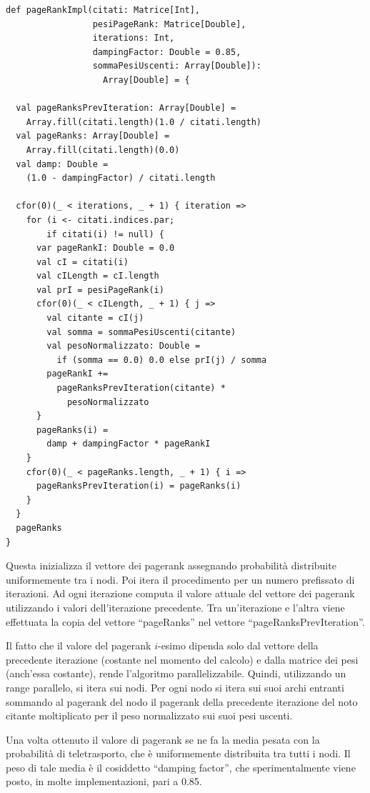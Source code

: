 \documentclass[a4paper, 12pt]{article}
\begin{document}
\begin{lstlisting}[keepspaces=true]
def pageRankImpl(citati: Matrice[Int],
                 pesiPageRank: Matrice[Double],
                 iterations: Int,
                 dampingFactor: Double = 0.85,
                 sommaPesiUscenti: Array[Double]):
                   Array[Double] = {

  val pageRanksPrevIteration: Array[Double] =
    Array.fill(citati.length)(1.0 / citati.length)
  val pageRanks: Array[Double] =
    Array.fill(citati.length)(0.0)
  val damp: Double = 
    (1.0 - dampingFactor) / citati.length

  cfor(0)(_ < iterations, _ + 1) { iteration =>
    for (i <- citati.indices.par;
        if citati(i) != null) {
      var pageRankI: Double = 0.0
      val cI = citati(i)
      val cILength = cI.length
      val prI = pesiPageRank(i)
      cfor(0)(_ < cILength, _ + 1) { j =>
        val citante = cI(j)
        val somma = sommaPesiUscenti(citante)
        val pesoNormalizzato: Double =
          if (somma == 0.0) 0.0 else prI(j) / somma
        pageRankI += 
          pageRanksPrevIteration(citante) *
            pesoNormalizzato
      }
      pageRanks(i) = 
        damp + dampingFactor * pageRankI
    }
    cfor(0)(_ < pageRanks.length, _ + 1) { i =>
      pageRanksPrevIteration(i) = pageRanks(i)
    }
  }
  pageRanks
}
\end{lstlisting}
Questa inizializza il vettore dei pagerank assegnando probabilità distribuite uniformemente tra i nodi.
Poi itera il procedimento per un numero prefissato di iterazioni. Ad ogni iterazione computa il valore attuale del vettore dei pagerank utilizzando i valori dell'iterazione precedente. Tra un'iterazione e l'altra viene effettuata la copia del vettore ``pageRanks'' nel vettore ``pageRanksPrevIteration''.
\par
Il fatto che il valore del pagerank $i$-esimo dipenda solo dal vettore della precedente iterazione (costante nel momento del calcolo) e dalla matrice dei pesi (anch'essa costante), rende l'algoritmo parallelizzabile.
Quindi, utilizzando un range parallelo, si itera sui nodi. Per ogni nodo si itera sui suoi archi entranti sommando al pagerank del nodo il pagerank della precedente iterazione del noto citante moltiplicato per il peso normalizzato sui suoi pesi uscenti.
\par
Una volta ottenuto il valore di pagerank se ne fa la media pesata con la probabilità di teletrasporto, che è uniformemente distribuita tra tutti i nodi. Il peso di tale media è il cosiddetto ``damping factor'', che sperimentalmente viene posto, in molte implementazioni, pari a 0.85. 
\end{document}
